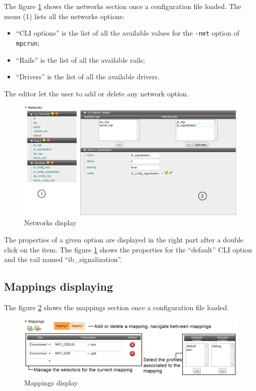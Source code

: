 \documentclass{article}
\begin{document}
The figure \ref{fig:networks_editor} shows the networks section once a configuration file loaded. The menu (1) lists all the networks options:
\begin{itemize}
\item ``CLI options'' is the list of all the available values for the \texttt{-net} option of \texttt{mpcrun};
\item ``Rails'' is the list of all the available rails;
\item ``Drivers'' is the list of all the available drivers.
\end{itemize}

\noindent The editor let the user to add or delete any network option.

\begin{figure}[!h]
\includegraphics[width=\textwidth]{./pictures/networks_editor.png}
\caption{Networks display}
\label{fig:networks_editor}
\end{figure}

\noindent The properties of a given option are displayed in the right part after a double click on the item. The figure \ref{fig:networks_editor} shows the properties for the ``default'' CLI option and the rail named ``ib\_signalization''.

\subsection{Mappings displaying}

The figure \ref{fig:mappings_editor} shows the mappings section once a configuration file loaded.

\begin{figure}[!h]
\includegraphics[width=\textwidth]{./pictures/mappings_editor.png}
\caption{Mappings display}
\label{fig:mappings_editor}
\end{figure}
\end{document}
